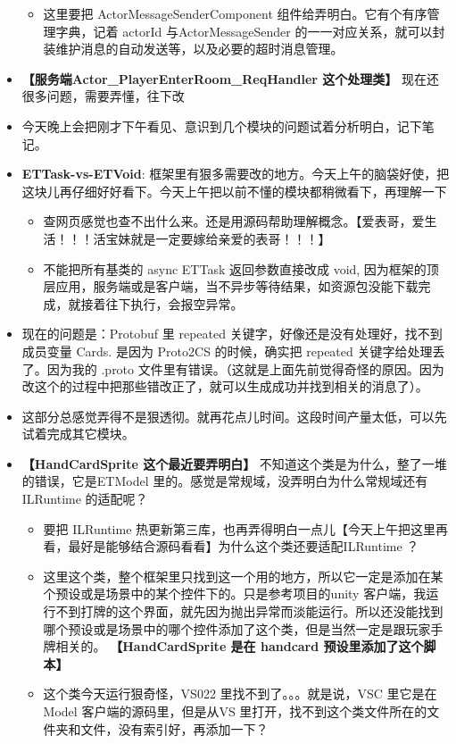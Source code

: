\documentclass[9pt, b5paper]{article}
\begin{document}
\begin{itemize}
\begin{itemize}
\item 这里要把 ActorMessageSenderComponent 组件给弄明白。它有个有序管理字典，记着 actorId 与ActorMessageSender 的一一对应关系，就可以封装维护消息的自动发送等，以及必要的超时消息管理。
\end{itemize}
\item \textbf{【服务端Actor\_PlayerEnterRoom\_ReqHandler 这个处理类】} 现在还很多问题，需要弄懂，往下改
\item 今天晚上会把刚才下午看见、意识到几个模块的问题试着分析明白，记下笔记。
\item \textbf{ETTask-vs-ETVoid}: 框架里有狠多需要改的地方。今天上午的脑袋好使，把这块儿再仔细好好看下。今天上午把以前不懂的模块都稍微看下，再理解一下
\begin{itemize}
\item 查网页感觉也查不出什么来。还是用源码帮助理解概念。【爱表哥，爱生活！！！活宝妹就是一定要嫁给亲爱的表哥！！！】
\item 不能把所有基类的 async ETTask 返回参数直接改成 void, 因为框架的顶层应用，服务端或是客户端，当不异步等待结果，如资源包没能下载完成，就接着往下执行，会报空异常。
\end{itemize}
\item 现在的问题是：Protobuf 里 repeated 关键字，好像还是没有处理好，找不到成员变量  Cards. 是因为 Proto2CS 的时候，确实把 repeated 关键字给处理丢了。因为我的 .proto 文件里有错误。（这就是上面先前觉得奇怪的原因。因为改这个的过程中把那些错改正了，就可以生成成功并找到相关的消息了）。
\item 这部分总感觉弄得不是狠透彻。就再花点儿时间。这段时间产量太低，可以先试着完成其它模块。
\item \textbf{【HandCardSprite 这个最近要弄明白】} 不知道这个类是为什么，整了一堆的错误，它是ETModel 里的。感觉是常规域，没弄明白为什么常规域还有ILRuntime 的适配呢？
\begin{itemize}
\item 要把 ILRuntime 热更新第三库，也再弄得明白一点儿【今天上午把这里再看，最好是能够结合源码看看】为什么这个类还要适配ILRuntime ？
\item 这里这个类，整个框架里只找到这一个用的地方，所以它一定是添加在某个预设或是场景中的某个控件下的。只是参考项目的unity 客户端，我运行不到打牌的这个界面，就先因为抛出异常而淡能运行。所以还没能找到哪个预设或是场景中的哪个控件添加了这个类，但是当然一定是跟玩家手牌相关的。 \textbf{【HandCardSprite 是在 handcard 预设里添加了这个脚本】}
\item 这个类今天运行狠奇怪，VS022 里找不到了。。。就是说，VSC 里它是在Model 客户端的源码里，但是从VS 里打开，找不到这个类文件所在的文件夹和文件，没有索引好，再添加一下？

\end{itemize}
\end{itemize}
\end{document}
